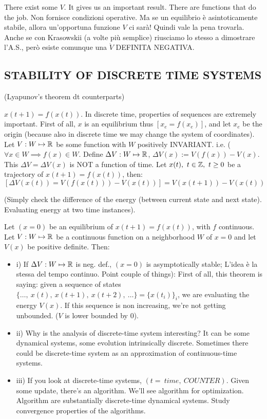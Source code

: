 There exist some $V$. It gives us an important result. There are functions that do the job. Non fornisce condizioni operative. Ma se un equilibrio è asintoticamente stabile, allora un'opportuna funzione $V$ ci sarà! Quindi vale la pena trovarla. Anche se con Krasowskii (a volte più semplice) riusciamo lo stesso a dimostrare l'A.S., però esiste comunque una $\dot{V}$ DEFINITA NEGATIVA.

\subsection{STABILITY OF DISCRETE TIME SYSTEMS} {(Lyapunov's theorem dt counterparts)}

$x(t+1)=f(x(t))$. In discrete time, properties of sequences are extremely important. First of all, $x$ is an equilibrium thus $[x_e=f(x_e)]$, and let $x_e$ be the origin (because also in discrete time we may change the system of coordinates). Let $V:W\mapsto \mathbb{R}$ be some function with $W$ positively INVARIANT. i.e. ($\forall x \in W \implies f(x) \in W$. Define $\Delta V:W\mapsto \mathbb{R}$, $\Delta V(x) := V(f(x)) - V(x)$. This $\Delta V = \Delta V(x)$ is NOT a function of time. Let $x(t),\ t \in \mathbb{Z},\ t \geq 0$ be a trajectory of $x(t+1)=f(x(t))$, then:
\[
	[\Delta V(x(t)) = V(f(x(t))) - V(x(t))] = V(x(t+1))-V(x(t))
\]

(Simply check the difference of the energy (between current state and next state). Evaluating energy at two time instances).

\begin{thrm}
Let $(x=0)$ be an equilibrium of $x(t+1)=f(x(t))$, with $f$ continuous. Let $V:W\mapsto \mathbb{R}$ be a continuous function on a neighborhood $W$ of $x=0$ and let $V(x)$ be positive definite. Then:
\begin{itemize}
\item{i)} If $\Delta V:W\mapsto \mathbb{R}$ is neg. def., $(x=0)$ is asymptotically stable; L'idea è la stessa del tempo continuo. 
Point couple of things): First of all, this theorem is saying: given a sequence of states $\{\dots,\ x(t),\ x(t+1),\ x(t+2),\ \dots\} = \{x(t_i)\}_i$, we are evaluating the energy $V(x)$. If this sequence is non increasing, we're not getting unbounded. ($V$ is lower bounded by 0).
\item{ii)} Why is the analysis of discrete-time system interesting? It can be some dynamical systems, some evolution intrinsically discrete. Sometimes there could be discrete-time system as an approximation of continuous-time systems.
\item{iii)} If you look at discrete-time systems, $(t =\ time,\ COUNTER)$. Given some update, there's an algorithm. We'll see algorithm for optimization. Algorithm are substantially discrete-time dynamical systems. Study convergence properties of the algorithms.
\end{itemize}
\end{thrm}

